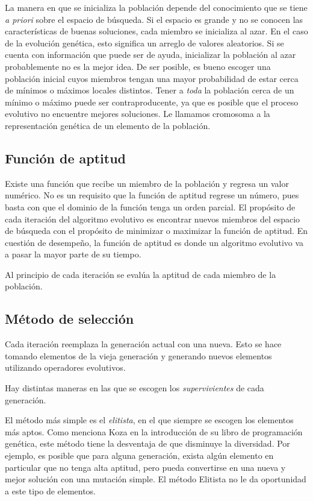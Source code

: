La manera en que se inicializa la población depende del conocimiento que se tiene
\emph{a priori} sobre el espacio de búsqueda. Si el espacio es grande y no se
conocen las características de buenas soluciones, cada miembro se inicializa al
azar. En el caso de la evolución genética, esto significa un arreglo de valores
aleatorios. Si se cuenta con información que puede ser de ayuda, inicializar la
población al azar probablemente no es la mejor idea. De ser posible, es bueno
escoger una población inicial cuyos miembros tengan una mayor probabilidad de
estar cerca de mínimos o máximos locales distintos. Tener a \emph{toda} la
población cerca de un mínimo o máximo puede ser contraproducente, ya que es posible que el
proceso evolutivo no encuentre mejores soluciones. Le llamamos cromosoma a la
representación genética de un elemento de la población.

\subsection { Función de aptitud }

Existe una función que recibe un miembro de la población y regresa un valor
numérico.  No es un requisito que la función de aptitud regrese un número, pues
basta con que el dominio de la función tenga un orden parcial. El propósito de
cada iteración del algoritmo evolutivo es encontrar nuevos miembros del espacio
de búsqueda con el propósito de minimizar o maximizar la función de aptitud. En
cuestión de desempeño, la función de aptitud es donde un algoritmo evolutivo va
a pasar la mayor parte de su tiempo.

Al principio de cada iteración se evalúa la aptitud de cada miembro de la población.

\subsection { Método de selección }

Cada iteración reemplaza la generación actual con una nueva. Esto se hace
tomando elementos de la vieja generación y generando nuevos elementos
utilizando operadores evolutivos.

Hay distintas maneras en las que se escogen los \emph{supervivientes} de cada
generación.

El método más simple es el \emph{elitista}, en el que siempre se escogen
los elementos más aptos. Como menciona Koza \cite{koza} en la introducción de su
libro de programación genética, este método tiene la desventaja de que
disminuye la diversidad. Por ejemplo, es posible que para alguna generación,
exista algún elemento en particular que no tenga alta aptitud, pero pueda
convertirse en una nueva y mejor solución con una mutación simple. El método
Elitista no le da oportunidad a este tipo de elementos.

